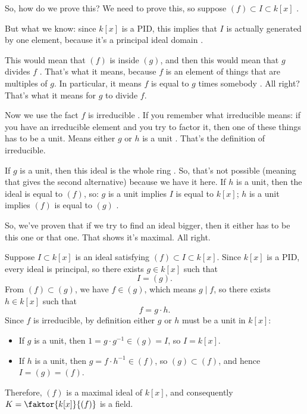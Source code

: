 \begin{proofWrapper}
\begin{speech}[01:05:54 - 01:08:17]
So, how do we prove this? We need to prove this, so suppose $(f) \subset I \subset k[x]$ .

But what we know: since $k[x]$ is a $\mathrm{PID}$, this implies that $I$ is actually generated by one element, because it's a principal ideal domain .

This would mean that $(f)$ is inside $(g)$, and then this would mean that $g$ divides $f$ . That's what it means, because $f$ is an element of things that are multiples of $g$. In particular, it means $f$ is equal to $g$ times somebody . All right? That's what it means for $g$ to divide $f$.

Now we use the fact $f$ is irreducible . If you remember what irreducible means: if you have an irreducible element and you try to factor it, then one of these things has to be a unit. Means either $g$ or $h$ is a unit . That's the definition of irreducible.

If $g$ is a unit, then this ideal is the whole ring . So, that's not possible (meaning that gives the second alternative) because we have it here. If $h$ is a unit, then the ideal is equal to $(f)$, so: $g$ is a unit implies $I$ is equal to $k[x]$; $h$ is a unit implies $(f)$ is equal to $(g)$ .

So, we've proven that if we try to find an ideal bigger, then it either has to be this one or that one. That shows it's maximal. All right.
\end{speech}

\begin{content}
Suppose $I \subset k[x]$ is an ideal satisfying $(f) \subset I \subset k[x]$. Since $k[x]$ is a $\mathrm{PID}$, every ideal is principal, so there exists $g \in k[x]$ such that
\[
I = (g).
\]
From $(f) \subset (g)$, we have $f \in (g)$, which means $g \mid f$, so there exists $h \in k[x]$ such that
\[
f = g \cdot h.
\]
Since $f$ is irreducible, by definition either $g$ or $h$ must be a unit in $k[x]$:
\begin{itemize}
    \item If $g$ is a unit, then $1 = g \cdot g^{-1} \in (g) = I$, so $I = k[x]$.
    \item If $h$ is a unit, then $g = f \cdot h^{-1} \in (f)$, so $(g) \subset (f)$, and hence $I = (g) = (f)$.
\end{itemize}
Therefore, $(f)$ is a maximal ideal of $k[x]$, and consequently $K = \faktor{k[x]}{(f)}$ is a field.
\end{content}

\end{proofWrapper}


